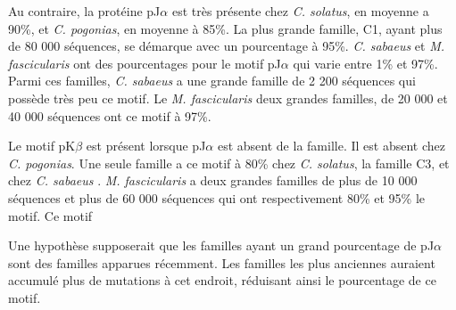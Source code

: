 \documentclass[12pt,a4paper]{article}
\begin{document}
			Au contraire, la protéine pJ$\alpha$ est très présente chez \textit{C. solatus}, en moyenne a 90\%, et \textit{C. pogonias}, en moyenne à 85\%. La plus grande famille, C1, ayant plus de 80 000 séquences, se démarque avec un pourcentage à  95\%. \textit{C. sabaeus} et \textit{M. fascicularis} ont des pourcentages pour le motif pJ$\alpha$ qui varie entre 1\% et 97\%. Parmi ces familles, \textit{C. sabaeus} a une grande famille de 2 200 séquences qui possède très peu ce motif. Le \textit{M. fascicularis} deux grandes familles, de 20 000 et 40 000 séquences ont ce motif à 97\%. 
			
			Le motif pK$\beta$ est présent lorsque pJ$\alpha$ est absent de la famille. Il est absent chez \textit{C. pogonias}. Une seule famille a ce motif à 80\% chez \textit{C. solatus}, la famille C3,  et chez \textit{C. sabaeus} . \textit{M. fascicularis} a deux grandes familles de plus de 10 000 séquences et plus de 60 000 séquences qui ont respectivement 80\% et 95\% le motif. Ce motif 
			
			Une hypothèse supposerait que les familles ayant un grand pourcentage de pJ$\alpha$ sont des familles apparues récemment. Les familles les plus anciennes auraient accumulé plus de mutations à cet endroit, réduisant ainsi le pourcentage de ce motif.
			
\end{document}
